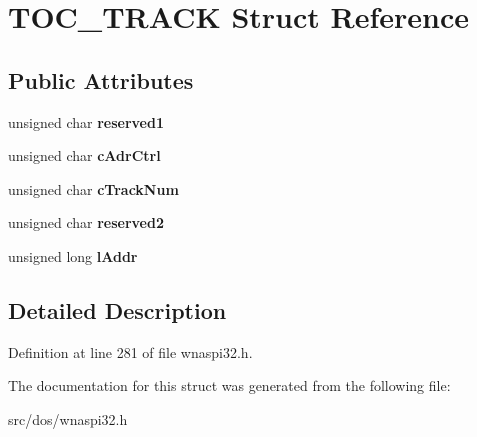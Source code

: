 \hypertarget{structTOC__TRACK}{\section{T\-O\-C\-\_\-\-T\-R\-A\-C\-K Struct Reference}
\label{structTOC__TRACK}
}
\subsection*{Public Attributes}
\begin{DoxyCompactItemize}
\item 
\hypertarget{structTOC__TRACK_a1929a0e282e9dbb689c3221ee2505487}{unsigned char {\bfseries reserved1}}\label{structTOC__TRACK_a1929a0e282e9dbb689c3221ee2505487}

\item 
\hypertarget{structTOC__TRACK_adf0c0d7777cd70c8be91b4136dfeb017}{unsigned char {\bfseries c\-Adr\-Ctrl}}\label{structTOC__TRACK_adf0c0d7777cd70c8be91b4136dfeb017}

\item 
\hypertarget{structTOC__TRACK_a80ec135f98ccc0ccbffdcca92d059409}{unsigned char {\bfseries c\-Track\-Num}}\label{structTOC__TRACK_a80ec135f98ccc0ccbffdcca92d059409}

\item 
\hypertarget{structTOC__TRACK_a78658e06d4c314054cabf7bb3b915c2b}{unsigned char {\bfseries reserved2}}\label{structTOC__TRACK_a78658e06d4c314054cabf7bb3b915c2b}

\item 
\hypertarget{structTOC__TRACK_a092cb0004e8dd36f278c7c7769581acc}{unsigned long {\bfseries l\-Addr}}\label{structTOC__TRACK_a092cb0004e8dd36f278c7c7769581acc}

\end{DoxyCompactItemize}


\subsection{Detailed Description}


Definition at line 281 of file wnaspi32.\-h.



The documentation for this struct was generated from the following file\-:\begin{DoxyCompactItemize}
\item 
src/dos/wnaspi32.\-h\end{DoxyCompactItemize}
